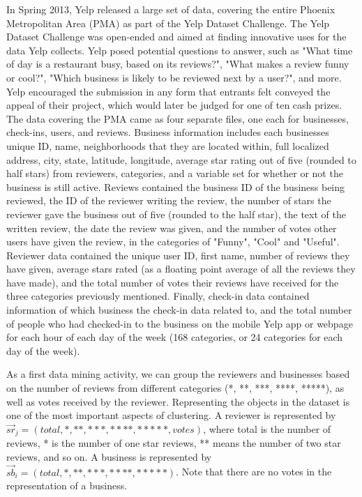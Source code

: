 \documentclass[oribibl]{llncs}
\begin{document}
In Spring 2013, Yelp released a large set of data, covering the entire Phoenix Metropolitan Area (PMA) as part of the Yelp Dataset Challenge.  The Yelp Dataset Challenge was open-ended and aimed at finding innovative uses for the data Yelp collects.  Yelp posed potential questions to answer, such as "What time of day is a restaurant busy, based on its reviews?", "What makes a review funny or cool?", "Which business is likely to be reviewed next by a user?", and more.  Yelp encouraged the submission in any form that entrants felt conveyed the appeal of their project, which would later be judged for one of ten cash prizes.
The data covering the PMA came as four separate files, one each for businesses, check-ins, users, and reviews.  Business information includes each businesses unique ID, name, neighborhoods that they are located within, full localized address, city, state, latitude, longitude, average star rating out of five (rounded to half stars) from reviewers, categories, and a variable set for whether or not the business is still active.  Reviews contained the business ID of the business being reviewed, the ID of the reviewer writing the review, the number of stars the reviewer gave the business out of five (rounded to the half star), the text of the written review, the date the review was given, and the number of votes other users have given the review, in the categories of "Funny", "Cool" and "Useful".  Reviewer data contained the unique user ID, first name, number of reviews they have given, average stars rated (as a floating point average of all the reviews they have made), and the total number of votes their reviews have received for the three categories previously mentioned.  Finally, check-in data contained information of which business the check-in data related to, and the total number of people who had checked-in to the business on the mobile Yelp app or webpage for each hour of each day of the week (168 categories, or 24 categories for each day of the week).

As a first data mining activity, we can group the reviewers and businesses based on the number of reviews from different categories (*, **, ***, ****, *****), 
as well as votes received by the reviewer. Representing the objects in the dataset is one of the most important aspects of clustering.
A reviewer is represented by $\vec{sr}_j =  (total, *,**,***,****,*****,votes)$,
where total is the number of reviews, * is the number of one star reviews, ** means the number of two star reviews, and so on.
A business is represented  by $\vec{sb}_i = (total, *,**,***,****,*****)$. Note that there are no votes in the representation of a business.
\end{document}
